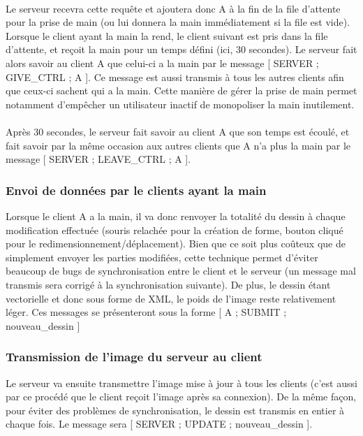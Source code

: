 \documentclass[a4paper,11pt]{article}
\begin{document}
\paragraph{} Le serveur recevra cette requête et ajoutera donc A à la fin de la file d'attente pour la prise de main (ou lui donnera la main immédiatement si la file est vide). Lorsque le client ayant la main la rend, le client suivant est pris dans la file d'attente, et reçoit la main pour un temps défini (ici, 30 secondes). Le serveur fait alors savoir au client A que celui-ci a la main par le message [ SERVER ; GIVE\_CTRL ; A ]. Ce message est aussi transmis à tous les autres clients afin que ceux-ci sachent qui a la main. Cette manière de gérer la prise de main permet notamment d'empêcher un utilisateur inactif de monopoliser la main inutilement. 

\paragraph{} Après 30 secondes, le serveur fait savoir au client A que son temps est écoulé, et fait savoir par la même occasion aux autres clients que A n'a plus la main par le message [ SERVER ; LEAVE\_CTRL ; A ].

\subsubsection{Envoi de données par le clients ayant la main}
Lorsque le client A a la main, il va donc renvoyer la totalité du dessin à chaque modification effectuée (souris relachée pour la création de forme, bouton cliqué pour le redimensionnement/déplacement). Bien que ce soit plus coûteux que de simplement envoyer les parties modifiées, cette technique permet d'éviter beaucoup de bugs de synchronisation entre le client et le serveur (un message mal transmis sera corrigé à la synchronisation suivante). De plus, le dessin étant vectorielle et donc sous forme de XML, le poids de l'image reste relativement léger. Ces messages se présenteront sous la forme [ A ; SUBMIT ; nouveau\_dessin ]

\subsubsection{Transmission de l'image du serveur au client}
Le serveur va ensuite transmettre l'image mise à jour à tous les clients (c'est aussi par ce procédé que le client reçoit l'image après sa connexion). De la même façon, pour éviter des problèmes de synchronisation, le dessin est transmis en entier à chaque fois. Le message sera [ SERVER ; UPDATE ; nouveau\_dessin ].
\end{document}
